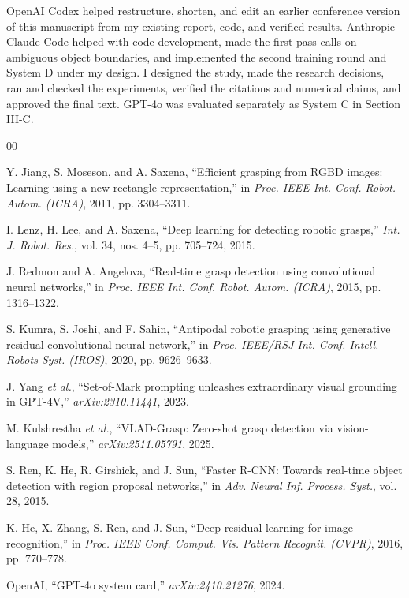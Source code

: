\documentclass[10pt,conference]{IEEEtran}
\begin{document}
OpenAI Codex helped restructure, shorten, and edit an earlier conference
version of this manuscript from my existing report, code, and verified
results. Anthropic Claude Code helped with
code development, made the first-pass calls on ambiguous object
boundaries, and implemented the second training round and System D under
my design. I designed the study, made the research decisions, ran and checked
the experiments, verified the citations and numerical claims, and approved
the final text. GPT-4o was evaluated separately as System C in Section III-C.

\balance
\begin{thebibliography}{00}

Y. Jiang, S. Moseson, and A. Saxena, ``Efficient grasping from RGBD images:
Learning using a new rectangle representation,'' in \emph{Proc. IEEE Int.
Conf. Robot. Autom. (ICRA)}, 2011, pp. 3304--3311.

I. Lenz, H. Lee, and A. Saxena, ``Deep learning for detecting robotic
grasps,'' \emph{Int. J. Robot. Res.}, vol. 34, nos. 4--5, pp. 705--724, 2015.

J. Redmon and A. Angelova, ``Real-time grasp detection using convolutional
neural networks,'' in \emph{Proc. IEEE Int. Conf. Robot. Autom. (ICRA)},
2015, pp. 1316--1322.

S. Kumra, S. Joshi, and F. Sahin, ``Antipodal robotic grasping using
generative residual convolutional neural network,'' in \emph{Proc. IEEE/RSJ
Int. Conf. Intell. Robots Syst. (IROS)}, 2020, pp. 9626--9633.

J. Yang \emph{et al.}, ``Set-of-Mark prompting unleashes extraordinary
visual grounding in GPT-4V,'' \emph{arXiv:2310.11441}, 2023.

M. Kulshrestha \emph{et al.}, ``VLAD-Grasp: Zero-shot grasp detection via
vision-language models,'' \emph{arXiv:2511.05791}, 2025.

S. Ren, K. He, R. Girshick, and J. Sun, ``Faster R-CNN: Towards real-time
object detection with region proposal networks,'' in \emph{Adv. Neural Inf.
Process. Syst.}, vol. 28, 2015.

K. He, X. Zhang, S. Ren, and J. Sun, ``Deep residual learning for image
recognition,'' in \emph{Proc. IEEE Conf. Comput. Vis. Pattern Recognit.
(CVPR)}, 2016, pp. 770--778.

OpenAI, ``GPT-4o system card,'' \emph{arXiv:2410.21276}, 2024.

\end{thebibliography}
\end{document}
